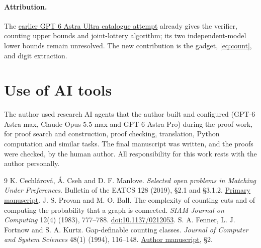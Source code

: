 \documentclass[10pt]{article}
\begin{document}
\paragraph{Attribution.}
The \href{https://github.com/mehmetmars7/Erdosproblems-llm-hunter/blob/00ced55ba1223fb48603e1f15028d753997ee515/attacks/open_problems/economics/gpt6_astra_ultra/C78-464.tex}{earlier GPT 6 Astra Ultra catalogue attempt}
already gives the verifier, counting upper bounds and joint-lottery
algorithm; its two independent-model lower bounds remain unresolved.
The new contribution is the gadget, \eqref{eq:count}, and digit extraction.

\clearpage
\section*{Use of AI tools}
The author used research AI agents that the author built and configured (GPT-6 Astra max,
Claude Opus 5.5 max and GPT-6 Astra Pro) during the proof work, for proof search and
construction, proof checking, translation, Python computation and similar tasks. The final
manuscript was written, and the proofs were checked, by the human author. All responsibility
for this work rests with the author personally.

\begin{thebibliography}{9}
K. Cechl\'arov\'a, \'{A}. Cseh and D. F. Manlove.
\emph{Selected open problems in Matching Under Preferences}.
Bulletin of the EATCS 128 (2019), \S2.1 and \S3.1.2.
\href{https://hpi.de/friedrich/docs/publications/2019/BEATCS.pdf}{Primary manuscript}.
J. S. Provan and M. O. Ball.
The complexity of counting cuts and of computing the probability
that a graph is connected.
\emph{SIAM Journal on Computing} 12(4) (1983), 777--788.
\href{https://doi.org/10.1137/0212053}{doi:10.1137/0212053}.
S. A. Fenner, L. J. Fortnow and S. A. Kurtz.
Gap-definable counting classes.
\emph{Journal of Computer and System Sciences} 48(1) (1994), 116--148.
\href{https://cse.sc.edu/~fenner/papers/gaps.pdf}{Author manuscript}, \S2.
\end{thebibliography}
\end{document}
